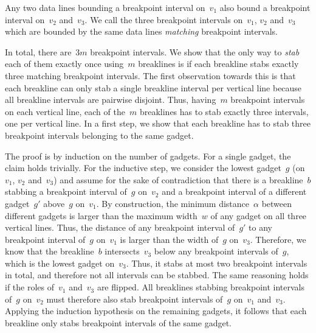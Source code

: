 Any two data lines bounding a breakpoint interval on~$v_1$ also bound a breakpoint interval on~$v_2$ and~$v_3$.
We call the three breakpoint intervals on~$v_1$, $v_2$ and~$v_3$ which are bounded by the same data lines \emph{matching} breakpoint intervals.

In total, there are~$3m$ breakpoint intervals.
We show that the only way to \emph{stab} each of them exactly once using~$m$ breaklines is if each breakline stabs exactly three matching breakpoint intervals.
The first observation towards this is that each breakline can only stab a single breakline interval per vertical line because all breakline intervals are pairwise disjoint.
Thus, having~$m$ breakpoint intervals on each vertical line, each of the~$m$ breaklines has to stab exactly three intervals, one per vertical line.
In a first step, we show that each breakline has to stab three breakpoint intervals belonging to the same gadget.


\begin{claimproof}
    The proof is by induction on the number of gadgets.
    For a single gadget, the claim holds trivially.
    For the inductive step, we consider the lowest gadget~$g$ (on~$v_1$, $v_2$ and~$v_3$) and assume for the sake of contradiction that there is a breakline~$b$ stabbing a breakpoint interval of~$g$ on~$v_2$ and a breakpoint interval of a different gadget~$g'$ above~$g$ on~$v_1$.
    By construction, the minimum distance~$\alpha$ between different gadgets is larger than the maximum width~$w$ of any gadget on all three vertical lines.
    Thus, the distance of any breakpoint interval of~$g'$ to any breakpoint interval of~$g$ on~$v_1$ is larger than the width of~$g$ on~$v_3$.
    Therefore, we know that the breakline~$b$ intersects~$v_3$ below any breakpoint intervals of~$g$, which is the lowest gadget on~$v_3$.
    Thus, it stabs at most two breakpoint intervals in total, and therefore not all intervals can be stabbed.
    The same reasoning holds if the roles of~$v_1$ and~$v_3$ are flipped.
    All breaklines stabbing breakpoint intervals of~$g$ on~$v_2$ must therefore also stab breakpoint intervals of~$g$ on~$v_1$ and~$v_3$.
    Applying the induction hypothesis on the remaining gadgets, it follows that each breakline only stabs breakpoint intervals of the same gadget.
\end{claimproof}

